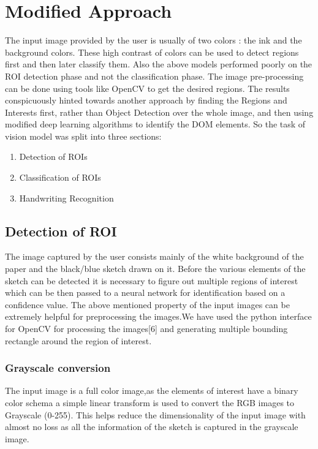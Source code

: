   \section{Modified Approach}
    The input image provided by the user is usually of two colors : the ink and the background colors. These high contrast of colors can be used to detect regions first and then later classify them. Also the above models performed poorly on the ROI detection phase and not the classification phase. The image pre-processing can be done using tools like OpenCV to get the desired regions.
    The results conspicuously hinted towards another approach by finding the Regions and Interests first, rather than Object Detection over the whole image, and then using modified deep learning algorithms to identify the DOM elements.
    So the task of vision model was split into three sections:
    \begin{enumerate}
  		\item Detection of ROIs
      \item Classification of ROIs
      \item Handwriting Recognition
  	\end{enumerate}

    \subsection{Detection of ROI}
      The image captured by the user consists mainly of the white background of the paper and the black/blue sketch drawn on it. Before the various elements of the sketch can be detected it is necessary to figure out multiple regions of interest which can be then passed to a neural network for identification based on a confidence value. The above mentioned property of the input images can be extremely helpful for preprocessing the images.We have used the python interface for OpenCV for processing the images[6] and generating multiple bounding rectangle around the region of interest.

      \subsubsection{Grayscale conversion}
        The input image is a full color image,as the elements of interest have a binary color schema a simple linear transform is used to convert the RGB images to Grayscale (0-255). This helps reduce the dimensionality of the input image with almost no loss as all the information of the sketch is captured in the grayscale image.


